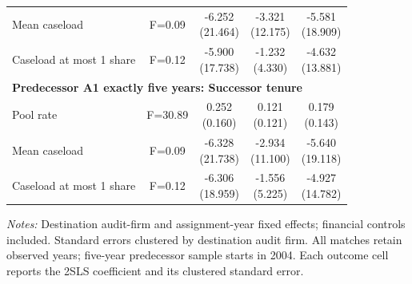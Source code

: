 \begin{table}[htbp]
\begin{threeparttable}
\begin{tabular}{p{}cccc}
Mean caseload & F=0.09 & \shortstack{-6.252\\(21.464)} & \shortstack{-3.321\\(12.175)} & \shortstack{-5.581\\(18.909)} \\
Caseload at most 1 share & F=0.12 & \shortstack{-5.900\\(17.738)} & \shortstack{-1.232\\(4.330)} & \shortstack{-4.632\\(13.881)} \\
\multicolumn{5}{l}{\textbf{Predecessor A1 exactly five years: Successor tenure}} \\
Pool rate & F=30.89 & \shortstack{0.252\\(0.160)} & \shortstack{0.121\\(0.121)} & \shortstack{0.179\\(0.143)} \\
Mean caseload & F=0.09 & \shortstack{-6.328\\(21.738)} & \shortstack{-2.934\\(11.100)} & \shortstack{-5.640\\(19.118)} \\
Caseload at most 1 share & F=0.12 & \shortstack{-6.306\\(18.959)} & \shortstack{-1.556\\(5.225)} & \shortstack{-4.927\\(14.782)} \\
\bottomrule
\end{tabular}
\begin{tablenotes}\footnotesize
\item \raggedright \textit{Notes:} Destination audit-firm and assignment-year fixed effects; financial controls included. Standard errors clustered by destination audit firm. All matches retain observed years; five-year predecessor sample starts in 2004. Each outcome cell reports the 2SLS coefficient and its clustered standard error.
\end{tablenotes}
\end{threeparttable}
\end{table}
